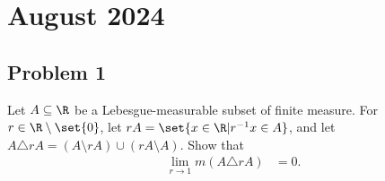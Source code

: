 \documentclass[10pt]{mypackage}
\begin{document}
\section{August 2024}%
\subsection{Problem 1}%
\begin{problem}
  Let $A\subseteq \R$ be a Lebesgue-measurable subset of finite measure. For $r\in\R\setminus \set{0}$, let $rA = \set{x\in \R | r^{-1}x\in A}$, and let $A\triangle rA = \left( A\setminus rA \right) \cup \left( rA\setminus A \right)$. Show that
  \begin{align*}
    \lim_{r\rightarrow 1} m\left( A\triangle rA \right) &= 0.
  \end{align*}
\end{problem}
\end{document}
